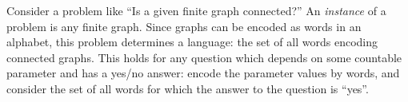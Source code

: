

\setcounter{section}{8}
\setcounter{subsection}{3}
\setcounter{dfn}{4}

Consider a problem like ``Is a given finite graph connected?''
An \emph{instance} of a problem is any finite graph.
Since graphs can be encoded as words in an alphabet, this problem determines a language:
the set of all words encoding connected graphs.
This holds for any question which depends on some countable parameter and has a yes/no answer:
encode the parameter values by words, and consider the set of all words for which the answer to the question is ``yes''.



